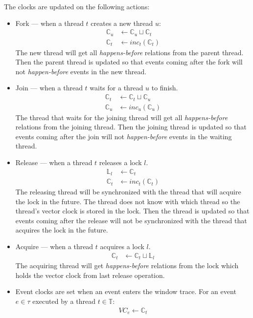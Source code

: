 The clocks are updated on the following actions:
\begin{itemize}
    \item Fork --- when a thread $t$ creates a new thread $u$:
        \begin{align*}
            \mathbb{C}_u &\leftarrow \mathbb{C}_u \sqcup \mathbb{C}_t \\
            \mathbb{C}_t &\leftarrow inc_t(\mathbb{C}_t)
        \end{align*}
        The new thread will get all \emph{happens-before} relations from the
        parent thread. Then the parent thread is updated so that events coming
        after the fork will not \emph{happen-before} events in the new thread.
    \item Join --- when a thread $t$ waits for a thread $u$ to finish.
        \begin{align*}
            \mathbb{C}_t &\leftarrow \mathbb{C}_t \sqcup \mathbb{C}_u \\
            \mathbb{C}_u &\leftarrow inc_u(\mathbb{C}_u)
        \end{align*}
        The thread that waits for the joining thread will get all
        \emph{happens-before} relations from the joining thread. Then the
        joining thread is updated so that events coming after the join will not
        \emph{happen-before} events in the waiting thread.
    \item Release --- when a thread $t$ releases a lock $l$.
        \begin{align*}
            \mathbb{L}_l &\leftarrow \mathbb{C}_t \\
            \mathbb{C}_t &\leftarrow inc_t(\mathbb{C}_t)
        \end{align*}
        The releasing thread will be synchronized with the thread that will
        acquire the lock in the future. The thread does not know with which
        thread so the thread's vector clock is stored in the lock. Then the
        thread is updated so that events coming after the release will not be
        synchronized with the thread that acquires the lock in the future.
    \item Acquire --- when a thread $t$ acquires a lock $l$.
        \begin{align*}
            \mathbb{C}_t &\leftarrow \mathbb{C}_t \sqcup \mathbb{L}_l
        \end{align*}
        The acquiring thread will get \emph{happens-before} relations from the
        lock which holds the vector clock from last release operation.
    \item Event clocks are set when an event enters the window trace. For an
        event $e \in \tau$ executed by a thread $t \in \mathbb{T}$:
        \begin{align*}
            VC_e \leftarrow \mathbb{C}_t
        \end{align*}
\end{itemize}


